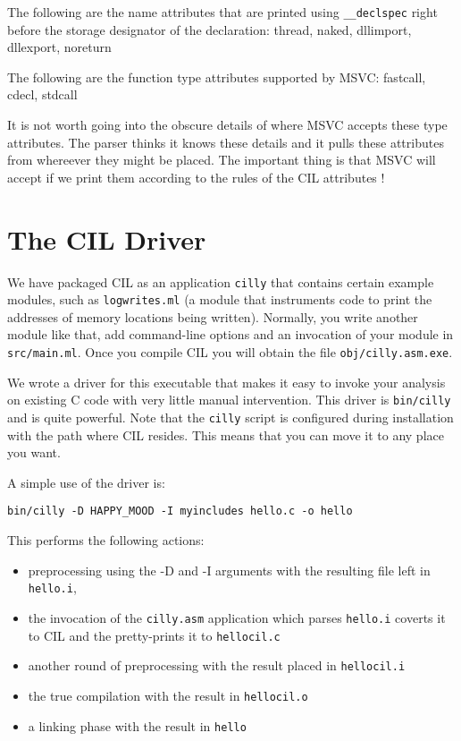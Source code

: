 \documentclass{article}
\def\t#1{{\tt #1}}
\begin{document}
   The following are the name attributes that are printed using
   \t{\_\_declspec} right before the storage designator of the declaration:
   thread, naked, dllimport, dllexport, noreturn


   The following are the function type attributes supported by MSVC: 
   fastcall, cdecl, stdcall

   It is not worth going into the obscure details of where MSVC accepts these
   type attributes. The parser thinks it knows these details and it pulls
   these attributes from whereever they might be placed. The important thing
   is that MSVC will accept if we print them according to the rules of the CIL
   attributes ! 

\section{The CIL Driver}\label{sec-driver}

 We have packaged CIL as an application \t{cilly} that contains certain
example modules, such as \t{logwrites.ml} (a module
that instruments code to print the addresses of memory locations being
written). Normally, you write another module like that, add command-line
options and an invocation of your module in \t{src/main.ml}. Once you compile
CIL you will obtain the file \t{obj/cilly.asm.exe}. 

 We wrote a driver for this executable that makes it easy to invoke your
analysis on existing C code with very little manual intervention. This driver
is \t{bin/cilly} and is quite powerful. Note that the \t{cilly} script
is configured during installation with the path where CIL resides. This means
that you can move it to any place you want. 

 A simple use of the driver is:
\begin{verbatim}
bin/cilly -D HAPPY_MOOD -I myincludes hello.c -o hello
\end{verbatim}

 This performs the following actions: 
\begin{itemize}
\item preprocessing using the -D and -I arguments with the resulting file left in \t{hello.i}, 
\item the invocation of the \t{cilly.asm} application which parses \t{hello.i}
coverts it to CIL and the pretty-prints it to \t{hellocil.c}
\item another round of preprocessing with the result placed in \t{hellocil.i}
\item the true compilation with the result in \t{hellocil.o}
\item a linking phase with the result in \t{hello}
\end{itemize}
 
\end{document}
